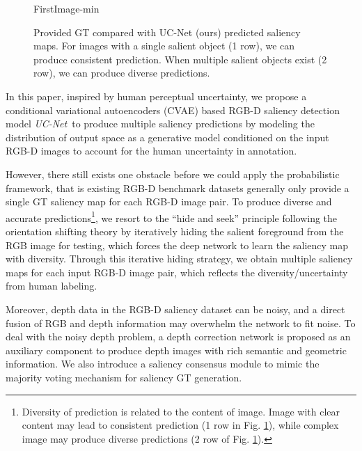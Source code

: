 \documentclass[10pt,twocolumn,letterpaper]{article}
\def\ourmodel{\textit{UC-Net}}
\begin{document}
\begin{figure}[t!]
	\centering
    \small
	\begin{overpic}[width=.98\columnwidth]{FirstImage-min}
    \end{overpic}
    \caption{Provided GT compared with UC-Net (ours) predicted saliency maps. For images with a single salient object (1  row), we can produce consistent prediction. When multiple salient objects exist (2 row),
we can produce diverse predictions.
}
\label{fig:inconsistent_ef_sod}
    \vspace{-4mm}
\end{figure}

In this paper, inspired by human perceptual uncertainty, we propose a conditional variational autoencoders \cite{structure_output} (CVAE) based RGB-D saliency detection model \ourmodel~to produce multiple saliency predictions by modeling the distribution of output space as a generative model conditioned on the input RGB-D images to account for the human uncertainty in annotation.

However, there still exists one obstacle before we could apply the probabilistic framework, that is existing RGB-D benchmark datasets generally only provide a single GT saliency map for each RGB-D image pair. 
To produce diverse and accurate predictions\footnote{Diversity of prediction is related to the content of image. Image with clear content may lead to consistent prediction (1 row in Fig. \ref{fig:inconsistent_ef_sod}), while complex image may produce diverse predictions (2 row of Fig. \ref{fig:inconsistent_ef_sod}).}, we resort to the ``hide and seek'' \cite{hide_and_seek-iccv2017} principle following the orientation shifting theory \cite{ITTI20001489} by iteratively hiding the salient foreground from the RGB image for testing, which forces the deep network to learn the saliency map with diversity. 
Through this iterative hiding strategy, we obtain multiple saliency maps for each input RGB-D image pair, which reflects the diversity/uncertainty from human labeling.

Moreover, depth data in the RGB-D saliency dataset can be noisy, and a direct fusion of RGB and depth information may overwhelm the network to fit noise. To deal with the noisy depth problem, a depth correction network is proposed as an auxiliary component to produce depth images with rich semantic and geometric information. We also introduce a saliency consensus module to mimic the majority voting mechanism for saliency GT generation.
\end{document}
